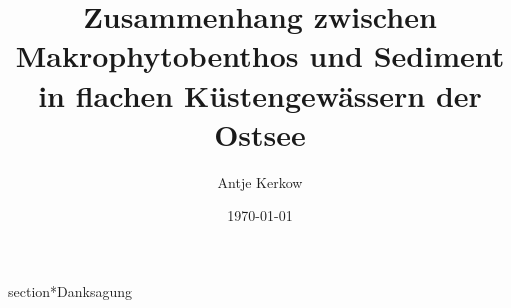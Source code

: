 



\pagestyle{empty}



\titlehead{Ernst Moritz Arndt Universität Greifswald\\
           Fachbereich Naturwissenschaften\\
           Institut für Landschaftsökologie und Naturschutz}

\subject{Diplomarbeit}

\title{Zusammenhang zwischen Makrophytobenthos und Sediment in flachen Küstengewässern der Ostsee}

\author{Antje Kerkow}

\date{\today} 

\publishers{Dozenten:\\PD Dr. Irmgard Blindow \\Prof. Dr. Hendrik Schubert}





\maketitle %
\clearpage

section*{Danksagung}

\clearpage

\pagestyle{scrheadings}    %
\clearscrheadfoot

\cfoot{\pagemark}
\chead{\headmark}


\tableofcontents

\newpage

\listoffigures

